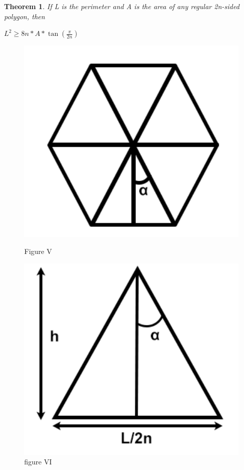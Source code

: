 \documentclass[a4paper]{book}
\newtheorem{theorem}{Theorem}%
\numberwithin{theorem}{section}%
\begin{document}
\begin{theorem}
    If L is the perimeter and A is the area of any regular 2n-sided polygon, then 
    \begin{center}
        $L^{2}\geq8n*A*\tan{(\frac{\pi}{2n})}$
    \end{center}
\end{theorem}

\begin{figure} [h]
    \centering
    \begin{minipage}{0.5\textwidth}
        \centering
        \includegraphics[width=1\textwidth]{isofig8.png} %
        \caption{Figure V}
    \end{minipage}\hfill
    \begin{minipage}{0.5\textwidth}
        \centering
        \includegraphics[width=1\textwidth]{isofig9.png} %
        \caption{figure VI}
    \end{minipage}
\end{figure}
\end{document}
